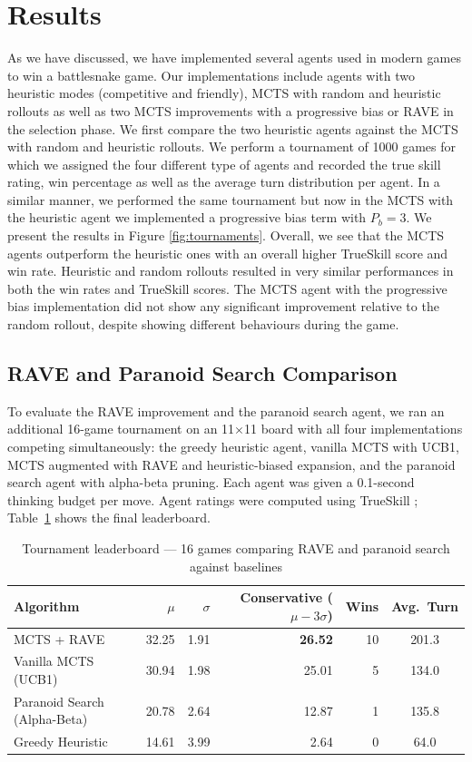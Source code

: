 \documentclass[12pt,a4paper]{article}
\begin{document}
\pagebreak
\section{Results}\label{sec:results}
As we have discussed, we have implemented several agents used in modern games to win a battlesnake game. Our implementations include agents with two heuristic modes (competitive and friendly), MCTS with random and heuristic rollouts as well as two MCTS improvements with a progressive bias or RAVE in the selection phase. We first compare the two heuristic agents against the MCTS with random and heuristic rollouts. We perform a tournament of 1000 games for which we assigned the four different type of agents and recorded the true skill rating, win percentage as well as the average turn distribution per agent. In a similar manner, we performed the same tournament but now in the MCTS with the heuristic agent we implemented a progressive bias term with $P_b=3$. We present the results in Figure \ref{fig:tournaments}. Overall, we see that the MCTS agents outperform the heuristic ones with an overall higher TrueSkill score and win rate. Heuristic and random rollouts resulted in very similar performances in both the win rates and TrueSkill scores. The MCTS agent with the progressive bias implementation did not show any significant improvement relative to the random rollout, despite showing different behaviours during the game.

\subsection{RAVE and Paranoid Search Comparison}

To evaluate the RAVE improvement and the paranoid search agent, we ran an additional 16-game tournament on an 11$\times$11 board with all four implementations competing simultaneously: the greedy heuristic agent, vanilla MCTS with UCB1, MCTS augmented with RAVE and heuristic-biased expansion, and the paranoid search agent with alpha-beta pruning. Each agent was given a 0.1-second thinking budget per move. Agent ratings were computed using TrueSkill \citep{herbrich2006trueskill}; Table~\ref{tab:rave-results} shows the final leaderboard.

\begin{table}[H]
\centering
\caption{Tournament leaderboard — 16 games comparing RAVE and paranoid search against baselines}
\label{tab:rave-results}
\begin{tabular}{lrrrrc}
\hline
\textbf{Algorithm} & $\mu$ & $\sigma$ & \textbf{Conservative} ($\mu{-}3\sigma$) & \textbf{Wins} & \textbf{Avg.\ Turn} \\
\hline
MCTS + RAVE                   & 32.25 & 1.91 & \textbf{26.52} & 10 & 201.3 \\
Vanilla MCTS (UCB1)            & 30.94 & 1.98 & 25.01          &  5 & 134.0 \\
Paranoid Search (Alpha-Beta)   & 20.78 & 2.64 & 12.87          &  1 & 135.8 \\
Greedy Heuristic               & 14.61 & 3.99 &  2.64          &  0 &  64.0 \\
\hline
\end{tabular}
\end{table}
\end{document}
